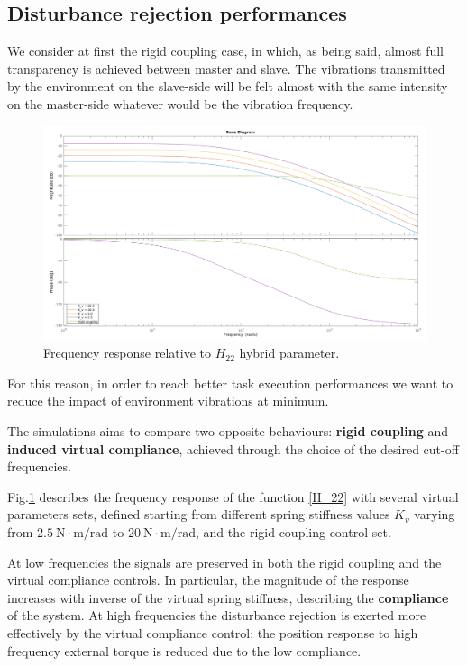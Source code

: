 \subsection{Disturbance rejection performances}

We consider at first the rigid coupling case, in which, as being said, almost
full transparency is achieved between master and slave. The vibrations
transmitted by the environment on the slave-side will be felt almost with the same intensity on the master-side whatever would be the vibration frequency.

\begin{figure}[h]
	\centering
	\includegraphics[width=1\linewidth]{Images/bodeplot2.png}
	\caption{Frequency response relative to $ H_{22} $ hybrid parameter.}
	\label{fig:bodo}
\end{figure}

For this reason, in order to reach better task execution performances we want to
reduce the impact of environment vibrations at minimum.

The simulations aims to compare two opposite behaviours: \textbf{rigid coupling}
and \textbf{induced virtual compliance}, achieved through the choice of
the desired cut-off frequencies.

Fig.\ref{fig:bodo} describes the frequency response of the function \eqref{H_22} with several virtual parameters sets, defined starting from different spring stiffness values $ K_v $ varying from $ 2.5 \ \text{N}\cdot\text{m}/\text{rad} $ to $ 20 \ \text{N}\cdot\text{m}/\text{rad} $, and the rigid coupling control set.

At low frequencies the signals are preserved in both the rigid coupling and the virtual compliance controls. In particular, the magnitude of the response increases with inverse of the virtual spring stiffness, describing the \textbf{compliance} of the system. At high frequencies the disturbance rejection is exerted more effectively by the virtual compliance control: the position response to high frequency external torque is reduced due to the low compliance.


